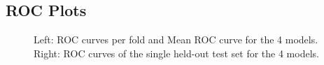 \documentclass[11pt, letterpaper, journal]{IEEEtran}
\begin{document}
\subsection{ROC Plots}
\begin{figure}
    \centering
    \qquad
    \caption{Left: ROC curves per fold and Mean ROC curve for the 4 models. Right: ROC curves of the single held-out test set for the 4 models.}
    \label{fig:ROC_curves scheme1}
\end{figure}
\end{document}
